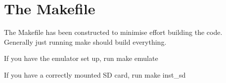 \chapter{The Makefile}
\hypertarget{md_docs_2pages_2makefile}{}\label{md_docs_2pages_2makefile}
\label{md_docs_2pages_2makefile_autotoc_md18}%
%
 The Makefile has been constructed to minimise effort building the code. Generally just running {\ttfamily make} should build everything.

If you have the emulator set up, run {\ttfamily make emulate}

If you have a correctly mounted SD card, run {\ttfamily make inst\+\_\+sd} 